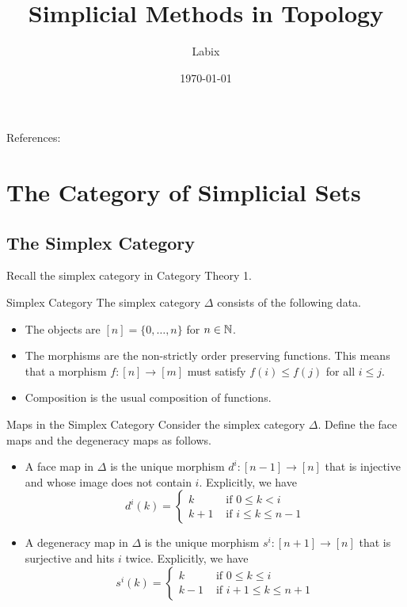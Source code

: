 \documentclass[a4paper]{article}
\title{Simplicial Methods in Topology}
\author{Labix}
\date{\today}
\begin{document}
\maketitle
\begin{abstract}

\end{abstract}
References: 

\pagebreak
\tableofcontents

\pagebreak

\section{The Category of Simplicial Sets}
\subsection{The Simplex Category}
Recall the simplex category in Category Theory 1. 

\begin{defn}{Simplex Category}{} The simplex category $\Delta$ consists of the following data. 
\begin{itemize}
\item The objects are $[n]=\{0,\dots,n\}$ for $n\in\mathbb{N}$. 
\item The morphisms are the non-strictly order preserving functions. This means that a morphism $f:[n]\to[m]$ must satisfy $f(i)\leq f(j)$ for all $i\leq j$. 
\item Composition is the usual composition of functions. 
\end{itemize}
\end{defn}

\begin{defn}{Maps in the Simplex Category}{} Consider the simplex category $\Delta$. Define the face maps and the degeneracy maps as follows. 
\begin{itemize}
\item A face map in $\Delta$ is the unique morphism $d^i:[n-1]\to[n]$ that is injective and whose image does not contain $i$. Explicitly, we have $$d^i(k)=\begin{cases}
k & \text{ if } 0\leq k <i\\
k+1 & \text{ if } i\leq k\leq n-1
\end{cases}$$
\item A degeneracy map in $\Delta$ is the unique morphism $s^i:[n+1]\to[n]$ that is surjective and hits $i$ twice. Explicitly, we have $$s^i(k)=\begin{cases}
k & \text{ if } 0\leq k\leq i\\
k-1 & \text{ if } i+1\leq k\leq n+1
\end{cases}$$
\end{itemize}
\end{defn}
\end{document}
